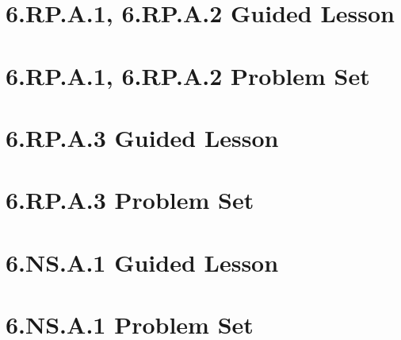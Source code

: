 \documentclass[a4paper,12pt]{article}
\title{}
\date{}
\begin{document}

\hypertarget{toc}{}  %

\tableofcontents
\newpage

\pagestyle{fancy}  %

\newpage
\section{6.RP.A.1, 6.RP.A.2 Guided Lesson}


\newpage
\section{6.RP.A.1, 6.RP.A.2 Problem Set}


\newpage
\section{6.RP.A.3 Guided Lesson}


\newpage
\section{6.RP.A.3 Problem Set}


\newpage
\section{6.NS.A.1 Guided Lesson}


\newpage
\section{6.NS.A.1 Problem Set}

\end{document}
